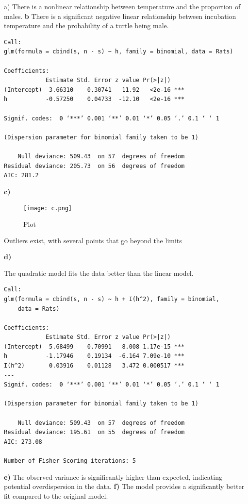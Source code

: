 \documentclass{article}
\begin{document}
a) There is a nonlinear relationship between temperature and the proportion of males.
\newline
\newline
\newline
\textbf{b}
There is a significant negative linear relationship between incubation temperature and the probability of a turtle being male.
\begin{verbatim}
Call:
glm(formula = cbind(s, n - s) ~ h, family = binomial, data = Rats)

Coefficients:
            Estimate Std. Error z value Pr(>|z|)
(Intercept)  3.66310    0.30741   11.92   <2e-16 ***
h           -0.57250    0.04733  -12.10   <2e-16 ***
---
Signif. codes:  0 ‘***’ 0.001 ‘**’ 0.01 ‘*’ 0.05 ‘.’ 0.1 ‘ ’ 1

(Dispersion parameter for binomial family taken to be 1)

    Null deviance: 509.43  on 57  degrees of freedom
Residual deviance: 205.73  on 56  degrees of freedom
AIC: 281.2
\end{verbatim}

\textbf{c)}
\begin{figure}[H] %
  \centering
  \texttt{[image: c.png]}
  \caption{Plot}
  \label{fig:enter-label}
\end{figure}


Outliers exist, with several points that go beyond the limits


\textbf{d) }


The quadratic model fits the data better than the linear model.

\begin{verbatim}
Call:
glm(formula = cbind(s, n - s) ~ h + I(h^2), family = binomial,
    data = Rats)

Coefficients:
            Estimate Std. Error z value Pr(>|z|)
(Intercept)  5.68499    0.70991   8.008 1.17e-15 ***
h           -1.17946    0.19134  -6.164 7.09e-10 ***
I(h^2)       0.03916    0.01128   3.472 0.000517 ***
---
Signif. codes:  0 ‘***’ 0.001 ‘**’ 0.01 ‘*’ 0.05 ‘.’ 0.1 ‘ ’ 1

(Dispersion parameter for binomial family taken to be 1)

    Null deviance: 509.43  on 57  degrees of freedom
Residual deviance: 195.61  on 55  degrees of freedom
AIC: 273.08

Number of Fisher Scoring iterations: 5
\end{verbatim}



\textbf{ e) }
The observed variance is significantly higher than expected, indicating potential overdispersion in the data.
\newline
\newline
\newline
\textbf{ f) }
The model provides a significantly better fit compared to the original model.
\end{document}
